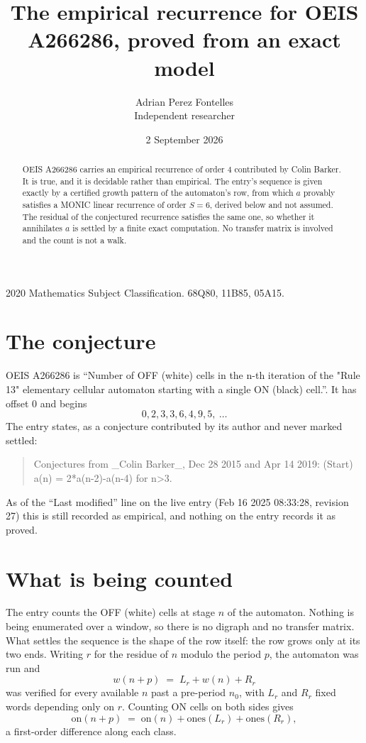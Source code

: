 \documentclass[11pt,a4paper]{article}
\title{The empirical recurrence for OEIS A266286, proved from an exact model}
\author{Adrian Perez Fontelles\\ \small Independent researcher}
\date{2 September 2026}
\theoremstyle{plain}
\theoremstyle{definition}
\begin{document}
\maketitle

\begin{abstract}
OEIS A266286 carries an empirical recurrence of order $4$ contributed by Colin Barker. It is true, and it is
decidable rather than empirical. The entry's sequence is given exactly by a certified growth pattern of the automaton's row, from
which $a$ provably satisfies a MONIC linear recurrence of order $S=6$, derived below and not
assumed. The residual of the conjectured recurrence satisfies the same one, so whether it
annihilates $a$ is settled by a finite exact computation. No transfer matrix is involved and
the count is not a walk.
\end{abstract}

\noindent\small 2020 Mathematics Subject Classification. 68Q80, 11B85, 05A15.\normalsize

\section{The conjecture}

OEIS A266286 is ``Number of OFF (white) cells in the n-th iteration of the "Rule 13" elementary cellular automaton starting with a single ON (black) cell.''. It has offset $0$ and begins
\[
0, 2, 3, 3, 6, 4, 9, 5,\ \dots
\]
The entry states, as a conjecture contributed by its author and never marked settled:
\begin{quote}
Conjectures from \_Colin Barker\_, Dec 28 2015 and Apr 14 2019: (Start) a(n) = 2*a(n-2)-a(n-4) for n>3.
\end{quote}
As of the ``Last modified'' line on the live entry (Feb 16 2025 08:33:28, revision 27)
this is still recorded as empirical, and nothing on the entry records it as proved.

\section{What is being counted}

The entry counts the OFF (white) cells at stage $n$ of the automaton. Nothing is being enumerated over a window, so there is
no digraph and no transfer matrix. What settles the sequence is the shape of the row itself:
the row grows only at its two ends. Writing
$r$ for the residue of $n$ modulo the period $p$, the automaton was run and
\[
w(n+p)\;=\;L_r + w(n) + R_r
\]
was verified for every available $n$ past a
pre-period $n_0$, with $L_r$ and $R_r$ fixed words depending only on $r$. Counting ON cells on
both sides gives
\[
\mathrm{on}(n+p)\;=\;\mathrm{on}(n)+\mathrm{ones}(L_r)+\mathrm{ones}(R_r),
\]
a first-order difference along each class.
\end{document}
